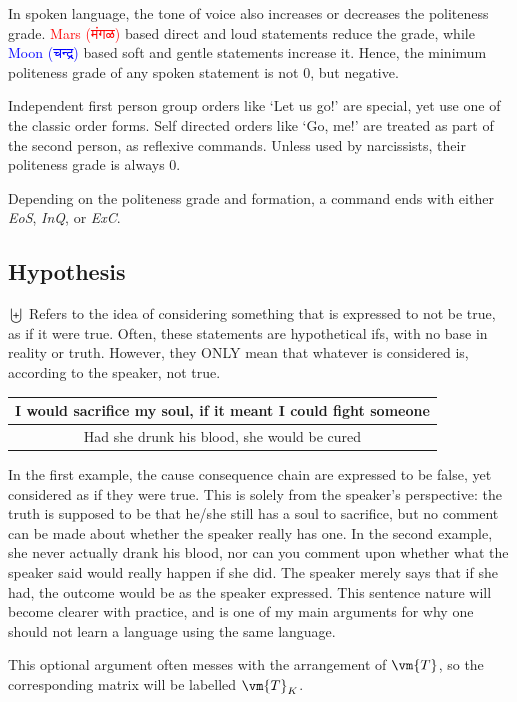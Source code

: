 In spoken language,  the tone of voice also increases or decreases the politeness grade. \textcolor{red}{Mars (\textsanskrit{मंगळ})} based direct and loud statements reduce the grade, while \textcolor{blue}{Moon (\textsanskrit{चन्द्र})} based soft and gentle statements increase it. Hence, the minimum politeness grade of any spoken statement is not $0$, but negative.

Independent first person group orders like `Let us go!' are special, yet use one of the classic order forms. Self directed orders like `Go, me!' are treated as part of the second person, as  reflexive commands. Unless used by narcissists, their politeness grade is always $0$.

Depending on the politeness grade and formation, a command ends with either \textit{EoS}, \textit{InQ}, or \textit{ExC}.
\subsection{Hypothesis}
$\biguplus$ Refers to the idea of considering something that is expressed to not be true, as if it were true. Often, these statements are  hypothetical ifs, with no base in reality or truth. However, they ONLY mean that whatever is considered is, according to the speaker, not true.
\begin{example}
    \begin{tabular}{c}
    I would sacrifice my soul, if it meant I could fight someone\\\hline
    Had she drunk his blood, she would be cured
    \end{tabular}
\end{example}
In the first example, the cause consequence chain are expressed to be false, yet considered as if they were true. This is solely from the speaker's perspective: the truth is supposed to be that he/she still has a soul to sacrifice, but no comment can be made about whether the speaker really has one. In the second example, she never actually drank his blood, nor can you comment upon whether what the speaker said would really happen if she did. The speaker merely says that if she had, the outcome would be as the speaker expressed. This sentence nature will become clearer with practice, and is one of my  main arguments for why one should not learn a language using the same language.

This optional argument often messes with the arrangement of $\vm{T}$, so the corresponding matrix will be labelled $\vm{T}_K$.

